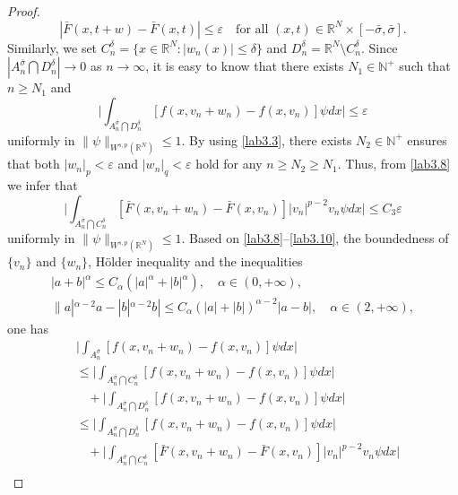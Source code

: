 \documentclass[10pt,a4paper]{amsart}
\numberwithin{equation}{section}
\begin{document}
\begin{proof}
\begin{equation}\label{lab3.8}
|\bar{F}(x,t+w)-\bar{F}(x,t)|\leq\varepsilon\quad \text{for all }
  (x,t)\in\mathbb{R}^N\times[-\bar{\sigma}, \bar{\sigma}].
\end{equation}
Similarly, we set $C^\delta_n=\{x\in\mathbb{R}^N: |w_n(x)|\leq\delta \}$ and 
$D^\delta_n=\mathbb{R}^N\setminus C^\delta_n$. 
Since $|A^{\bar{\sigma}}_n\bigcap D^\delta_n|\to 0$ as $n\to \infty$, 
it is easy to know that there exists $N_1\in \mathbb{N}^+$ such that $n\geq N_1$ and
\begin{equation}\label{lab3.9}
\Big|\int_{A^{\bar{\sigma}}_n\bigcap D^\delta_n} [f(x,v_n+w_n)
-f(x,v_n)]\psi dx\Big|\leq\varepsilon
\end{equation}
uniformly in $\|\psi\|_{W^{s,p}(\mathbb{R}^N)}\leq1$. 
By using \eqref{lab3.3}, there exists $N_2\in \mathbb{N}^+$ ensures that both 
$|w_n|_p<\varepsilon$ and $|w_n|_q<\varepsilon$ hold for any $n\geq N_2\geq N_1$. 
Thus, from \eqref{lab3.8} we infer that
\begin{equation}\label{lab3.10}
\Big|\int_{A^{\bar{\sigma}}_n\bigcap C^\delta_n} [\bar{F}(x,v_n+w_n)
-\bar{F}(x,v_n)]|v_n|^{p-2}v_n\psi dx\Big|\leq C_3\varepsilon
\end{equation}
uniformly in $\|\psi\|_{W^{s,p}(\mathbb{R}^N)}\leq1$. 
Based on \eqref{lab3.8}--\eqref{lab3.10}, the boundedness of $\{v_n\}$ and 
$\{w_n\}$, H\"older inequality and the  inequalities
\begin{equation}\label{lab3.11}
\begin{gathered}
|a+b|^\alpha\leq C_{\alpha}(|a|^\alpha+|b|^\alpha), \quad \alpha\in(0, +\infty),  \\
\|a|^{\alpha-2}a-|b|^{\alpha-2}b|\leq C_\alpha(|a|+|b|)^{\alpha-2}|a-b|, \quad
 \alpha\in(2, +\infty), 
\end{gathered}
\end{equation}
one has
\begin{align*}
&\Big|\int_{A^{\bar{\sigma}}_n} [f(x,v_n+w_n)-f(x,v_n)]\psi dx\Big|   \\
&\leq\Big|\int_{A^{\bar{\sigma}}_n\bigcap C^\delta_n} [f(x,v_n+w_n)-f(x,v_n)]\psi dx\Big|  \\
&\ \ \ \ +\Big|\int_{A^{\bar{\sigma}}_n\bigcap D^\delta_n} [f(x,v_n+w_n)-f(x,v_n)]\psi dx\Big|   \\
&\leq\Big|\int_{A^{\bar{\sigma}}_n\bigcap D^\delta_n} [f(x,v_n+w_n)-f(x,v_n)]\psi dx\Big|   \\
&\ \ \ \ +\Big|\int_{A^{\bar{\sigma}}_n\bigcap C^\delta_n} [\bar{F}(x,v_n+w_n)-\bar{F}(x,v_n)]|v_n|^{p-2}v_n\psi dx\Big|   \\

\end{align*}
\end{proof}
\end{document}

